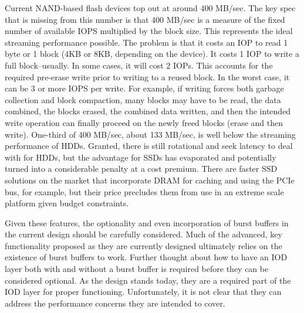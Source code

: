\documentclass[conference]{IEEEtran}
\begin{document}
Current NAND-based flash devices top out at around 400 MB/sec.  The key spec
that is missing from this number is that 400 MB/sec is a measure of the fixed
number of available IOPS multiplied by the block size. This represents the
ideal streaming performance possible. The problem is that it costs an IOP to
read 1 byte or 1 block (4KB or 8KB, depending on the device).  It costs 1 IOP
to write a full block--usually. In some cases, it will cost 2 IOPs.  This
accounts for the required pre-erase write prior to writing to a reused block.
In the worst case, it can be 3 or more IOPS per write. For example, if writing
forces both garbage collection and block compaction, many blocks may have to be
read, the data combined, the blocks erased, the combined data written, and then
the intended write operation can finally proceed on the newly freed blocks
(erase and then write).  One-third of 400 MB/sec, about 133 MB/sec, is well
below the streaming performance of HDDs.  Granted, there is still rotational
and seek latency to deal with for HDDs, but the advantage for SSDs has
evaporated and potentially turned into a considerable penalty at a cost
premium.  There are faster SSD solutions on the market that incorporate DRAM
for caching and using the PCIe bus, for example, but their price precludes them
from use in an extreme scale platform given budget constraints.

Given these features, the optionality and even incorporation of burst buffers
in the current design should be carefully considered. Much of the advanced, key
functionality proposed as they are currently designed ultimately relies on the
existence of burst buffers to work. Further thought about how to have an IOD
layer both with and without a burst buffer is required before they can be
considered optional. As the design stands today, they are a required part of
the IOD layer for proper functioning. Unfortunately, it is not clear that they
can address the performance concerns they are intended to cover.
\end{document}
